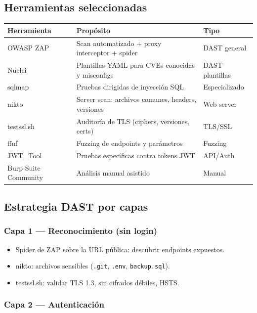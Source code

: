 \documentclass[12pt,a4paper,oneside]{article}
\begin{document}
\subsection{Herramientas seleccionadas}

\begin{table}[h]
\centering
\small
\begin{tabularx}{\textwidth}{lXl}
\toprule
\textbf{Herramienta} & \textbf{Propósito} & \textbf{Tipo} \\
\midrule
OWASP ZAP & Scan automatizado + proxy interceptor + spider & DAST general \\
Nuclei & Plantillas YAML para CVEs conocidas y misconfigs & DAST plantillas \\
sqlmap & Pruebas dirigidas de inyección SQL & Especializado \\
nikto & Server scan: archivos comunes, headers, versiones & Web server \\
testssl.sh & Auditoría de TLS (ciphers, versiones, certs) & TLS/SSL \\
ffuf & Fuzzing de endpoints y parámetros & Fuzzing \\
JWT\_Tool & Pruebas específicas contra tokens JWT & API/Auth \\
Burp Suite Community & Análisis manual asistido & Manual \\
\bottomrule
\end{tabularx}
\end{table}

\subsection{Estrategia DAST por capas}

\subsubsection{Capa 1 — Reconocimiento (sin login)}

\begin{itemize}[leftmargin=*]
  \item Spider de ZAP sobre la URL pública: descubrir endpoints expuestos.
  \item nikto: archivos sensibles (\texttt{.git}, \texttt{.env}, \texttt{backup.sql}).
  \item testssl.sh: validar TLS 1.3, sin cifrados débiles, HSTS.
\end{itemize}

\subsubsection{Capa 2 — Autenticación}
\end{document}
